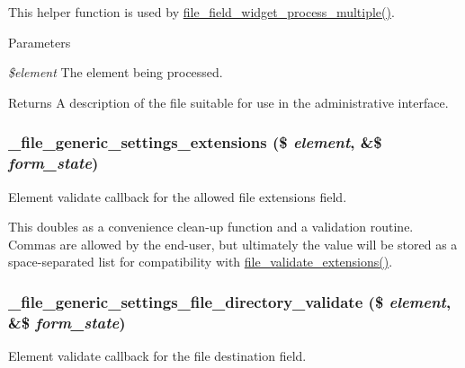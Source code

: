 This helper function is used by \hyperlink{file_8field_8inc_a4f8841b3519c2ead7100f1e74e129483}{file\_\-field\_\-widget\_\-process\_\-multiple()}.


\begin{DoxyParams}{Parameters}
\item[{\em \$element}]The element being processed.\end{DoxyParams}
\begin{DoxyReturn}{Returns}
A description of the file suitable for use in the administrative interface. 
\end{DoxyReturn}
\hypertarget{file_8field_8inc_a52e831776a1bcbb9b97a254a3e4795c7}{
\subsubsection[{\_\-file\_\-generic\_\-settings\_\-extensions}]{\setlength{\rightskip}{0pt plus 5cm}\_\-file\_\-generic\_\-settings\_\-extensions (\$ {\em element}, \/  \&\$ {\em form\_\-state})}}
\label{file_8field_8inc_a52e831776a1bcbb9b97a254a3e4795c7}
Element validate callback for the allowed file extensions field.

This doubles as a convenience clean-\/up function and a validation routine. Commas are allowed by the end-\/user, but ultimately the value will be stored as a space-\/separated list for compatibility with \hyperlink{group__file_ga4036c6b78f904e5dd0273cf75eb474bb}{file\_\-validate\_\-extensions()}. \hypertarget{file_8field_8inc_a053a6e2224eda84a0b92ee43fc761ec0}{
\subsubsection[{\_\-file\_\-generic\_\-settings\_\-file\_\-directory\_\-validate}]{\setlength{\rightskip}{0pt plus 5cm}\_\-file\_\-generic\_\-settings\_\-file\_\-directory\_\-validate (\$ {\em element}, \/  \&\$ {\em form\_\-state})}}
\label{file_8field_8inc_a053a6e2224eda84a0b92ee43fc761ec0}
Element validate callback for the file destination field.

